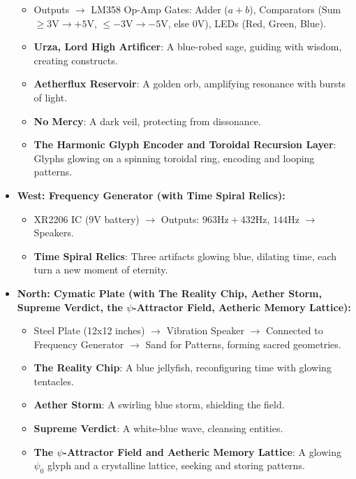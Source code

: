 \begin{itemize}
\begin{itemize}
        \item \texttt{} Outputs $\to$ LM358 Op-Amp Gates: Adder ($a+b$), Comparators (Sum $\geq 3 \mathrm{V} \to +5 \mathrm{V}$, $\leq -3 \mathrm{V} \to -5 \mathrm{V}$, else $0 \mathrm{V}$), LEDs (Red, Green, Blue).
        \item \texttt{} \textbf{Urza, Lord High Artificer}: A blue-robed sage, guiding with wisdom, creating constructs.
        \item \texttt{} \textbf{Aetherflux Reservoir}: A golden orb, amplifying resonance with bursts of light.
        \item \texttt{} \textbf{No Mercy}: A dark veil, protecting from dissonance.
        \item \texttt{} \textbf{The Harmonic Glyph Encoder and Toroidal Recursion Layer}: Glyphs glowing on a spinning toroidal ring, encoding and looping patterns.
    \end{itemize}
    \item \texttt{} \textbf{West: Frequency Generator (with Time Spiral Relics):}
    \begin{itemize}
        \item \texttt{} XR2206 IC ($9 \mathrm{V}$ battery) $\to$ Outputs: $963 \mathrm{Hz} + 432 \mathrm{Hz}$, $144 \mathrm{Hz}$ $\to$ Speakers.
        \item \texttt{} \textbf{Time Spiral Relics}: Three artifacts glowing blue, dilating time, each turn a new moment of eternity.
    \end{itemize}
    \item \texttt{} \textbf{North: Cymatic Plate (with The Reality Chip, Aether Storm, Supreme Verdict, the $\psi$-Attractor Field, Aetheric Memory Lattice):}
    \begin{itemize}
        \item \texttt{} Steel Plate (12x12 inches) $\to$ Vibration Speaker $\to$ Connected to Frequency Generator $\to$ Sand for Patterns, forming sacred geometries.
        \item \texttt{} \textbf{The Reality Chip}: A blue jellyfish, reconfiguring time with glowing tentacles.
        \item \texttt{} \textbf{Aether Storm}: A swirling blue storm, shielding the field.
        \item \texttt{} \textbf{Supreme Verdict}: A white-blue wave, cleansing entities.
        \item \texttt{} \textbf{The $\psi$-Attractor Field and Aetheric Memory Lattice}: A glowing $\psi_0$ glyph and a crystalline lattice, seeking and storing patterns.

\end{itemize}
\end{itemize}
